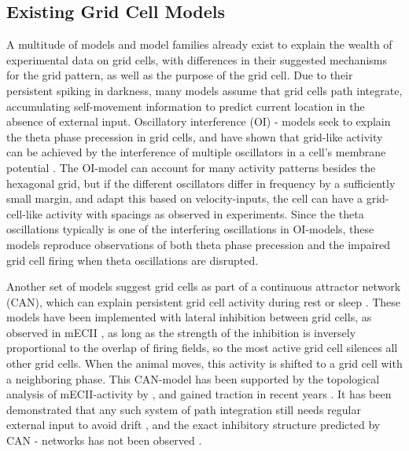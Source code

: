 \documentclass{article}
\begin{document}
    \subsection{Existing Grid Cell Models} \label{Grid Models}
    A multitude of models and model families already exist to explain the wealth of experimental data on grid cells, with differences in their suggested mechanisms for the grid pattern, as well as the purpose of the grid cell. Due to their persistent spiking in darkness, many models assume that grid cells path integrate, accumulating self-movement information to predict current location in the absence of external input. Oscillatory interference (OI) - models seek to explain the theta phase precession in grid cells, and have shown that grid-like activity can be achieved by the interference of multiple oscillators in a cell's membrane potential \parencite{Burgess2007,Zilli2010}. The OI-model can account for many activity patterns besides the hexagonal grid, but if the different oscillators differ in frequency by a sufficiently small margin, and adapt this based on velocity-inputs, the cell can have a grid-cell-like activity with spacings as observed in experiments. Since the theta oscillations typically is one of the interfering oscillations in OI-models, these models reproduce observations of both theta phase precession and the impaired grid cell firing when theta oscillations are disrupted.

    Another set of models suggest grid cells as part of a continuous attractor network (CAN), which can explain persistent grid cell activity during rest or sleep \parencite{Yoon2013,Widloski2014}. These models have been implemented with lateral inhibition between grid cells, as observed in mECII \parencite{Couey2013}, as long as the strength of the inhibition is inversely proportional to the overlap of firing fields, so the most active grid cell silences all other grid cells. When the animal moves, this activity is shifted to a grid cell with a neighboring phase. This CAN-model has been supported by the topological analysis of mECII-activity by \cite{Gardner2022}, and gained traction in recent years \parencite{Sorscher2023}. It has been demonstrated that any such system of path integration still needs regular external input to avoid drift \parencite{Cheung2007, Mulas2016}, and the exact inhibitory structure predicted by CAN - networks has not been observed \parencite{Zilli2012}. 
\end{document}
